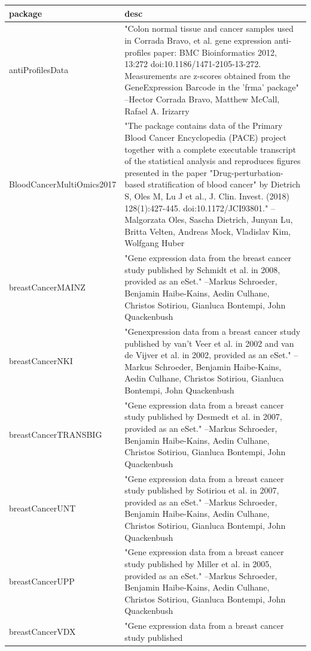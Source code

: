 \documentclass[]{article}
\begin{document}
\begin{longtable}[t]{l>{\raggedright\arraybackslash}p{25em}}
\toprule
package & desc\\
\midrule
antiProfilesData & "Colon normal tissue and cancer samples used in Corrada
Bravo, et al. gene expression anti-profiles paper: BMC
Bioinformatics 2012, 13:272 doi:10.1186/1471-2105-13-272.
Measurements are z-scores obtained from the GeneExpression
Barcode in the 'frma' package" --Hector Corrada Bravo, Matthew McCall, Rafael A. Irizarry\\
BloodCancerMultiOmics2017 & "The package contains data of the Primary Blood Cancer
Encyclopedia (PACE) project together with a complete executable
transcript of the statistical analysis and reproduces figures
presented in the paper "Drug-perturbation-based stratification
of blood cancer" by Dietrich S, Oles M, Lu J et al., J. Clin.
Invest. (2018) 128(1):427-445. doi:10.1172/JCI93801." --Malgorzata Oles, Sascha Dietrich, Junyan Lu, Britta Velten, Andreas Mock, Vladislav Kim, Wolfgang Huber\\
breastCancerMAINZ & "Gene expression data from the breast cancer study
published by Schmidt et al. in 2008, provided as an eSet." --Markus Schroeder, Benjamin Haibe-Kains, Aedin Culhane, Christos Sotiriou, Gianluca Bontempi, John Quackenbush\\
breastCancerNKI & "Genexpression data from a breast cancer study published by
van't Veer et al. in 2002 and van de Vijver et al. in 2002,
provided as an eSet." --Markus Schroeder, Benjamin Haibe-Kains, Aedin Culhane, Christos Sotiriou, Gianluca Bontempi, John Quackenbush\\
breastCancerTRANSBIG & "Gene expression data from a breast cancer study published
by Desmedt et al. in 2007, provided as an eSet." --Markus Schroeder, Benjamin Haibe-Kains, Aedin Culhane, Christos Sotiriou, Gianluca Bontempi, John Quackenbush\\
\addlinespace
breastCancerUNT & "Gene expression data from a breast cancer study published
by Sotiriou et al. in 2007, provided as an eSet." --Markus Schroeder, Benjamin Haibe-Kains, Aedin Culhane, Christos Sotiriou, Gianluca Bontempi, John Quackenbush\\
breastCancerUPP & "Gene expression data from a breast cancer study published
by Miller et al. in 2005, provided as an eSet." --Markus Schroeder, Benjamin Haibe-Kains, Aedin Culhane, Christos Sotiriou, Gianluca Bontempi, John Quackenbush\\
breastCancerVDX & "Gene expression data from a breast cancer study published

\end{longtable}
\end{document}
